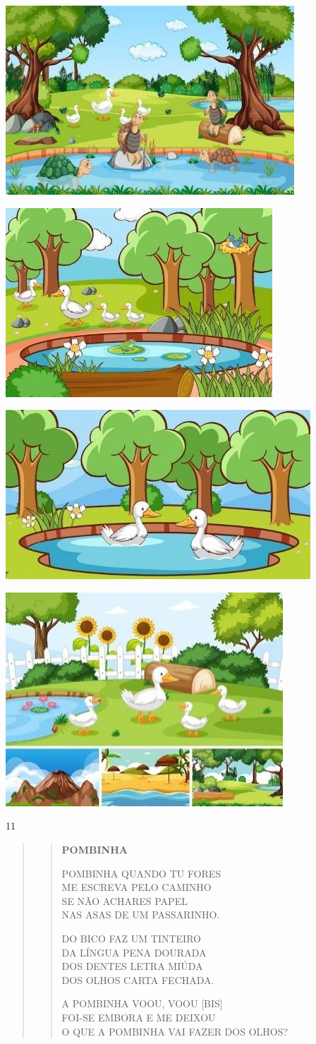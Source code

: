 \begin{escolha}
\item \includegraphics[width=.25\textwidth]{media/image250.jpg}

\item \includegraphics[width=.25\textwidth]{media/image251.jpg}

\item \includegraphics[width=.25\textwidth]{media/image252.jpg}

\item \includegraphics[width=.25\textwidth]{media/image253.jpg}
\end{escolha}


\num{11}

\begin{quote}
\begin{verse}
\textbf{POMBINHA}

POMBINHA QUANDO TU FORES\\
ME ESCREVA PELO CAMINHO\\
SE NÃO ACHARES PAPEL\\
NAS ASAS DE UM PASSARINHO.

DO BICO FAZ UM TINTEIRO\\
DA LÍNGUA PENA DOURADA\\
DOS DENTES LETRA MIÚDA\\
DOS OLHOS CARTA FECHADA.

A POMBINHA VOOU, VOOU {[}BIS{]}\\
FOI-SE EMBORA E ME DEIXOU\\
O QUE A POMBINHA VAI FAZER DOS OLHOS?
\end{verse}
\end{quote}

